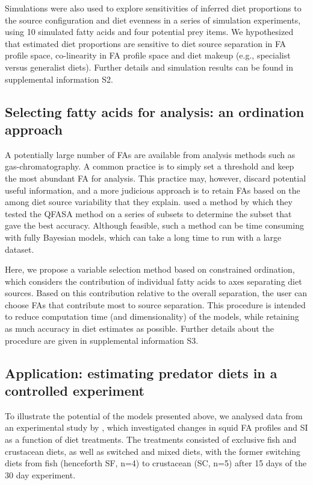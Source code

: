 \documentclass[fleqn,10pt]{wlpeerj}
\begin{document}
Simulations were also used to explore sensitivities of inferred diet proportions to the source
configuration and diet evenness in a series of
simulation experiments, using 10 simulated fatty acids and four potential prey items. We hypothesized that estimated diet
proportions are sensitive to diet source separation in FA profile space,
co-linearity in FA profile space \citep{blanchard_inference_2011} and diet makeup (e.g., specialist versus 
generalist diets). Further details and simulation results can be found
in supplemental information S2.

\subsection*{Selecting fatty acids for analysis: an ordination approach}

A potentially large number of FAs are available from analysis methods
such as gas-chromatography. A common practice is to simply set a
threshold and keep the most abundant FA for analysis. This practice
may, however, discard potential useful information, and a more
judicious approach is to retain FAs based on the among diet source
variability that they explain. \citet{wang_validating_2010} used a
method by which they tested the QFASA method on a series of subsets to
determine the subset that gave the best accuracy. Although feasible, such
a method can be time consuming with fully Bayesian models, which can take a long
time to run with a large dataset.

Here, we propose a variable selection method based on constrained
ordination, which considers the contribution of individual fatty
acids to axes separating diet sources. Based on this contribution
relative to the overall separation, the user can choose FAs
that contribute most to source separation. This procedure is intended
to reduce computation time (and dimensionality) of the models,
while retaining as much accuracy in diet estimates as possible. Further details about the
procedure are given in supplemental information S3.


\subsection*{Application: estimating predator diets in a controlled
  experiment}

To illustrate the potential of the models presented above, we analysed
data from an experimental study by
\citet{stowasser_experimental_2006}, which investigated changes in
squid FA profiles and SI as a function of diet treatments. The treatments consisted of
exclusive fish and crustacean diets, as well as switched and mixed
diets, with the former switching diets from fish (henceforth SF, n=4) to
crustacean (SC, n=5) after 15 days of the 30 day experiment. 
\end{document}
